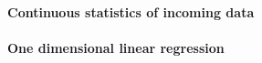 \paragraph{Continuous statistics of incoming data}








\paragraph{One dimensional linear regression}







